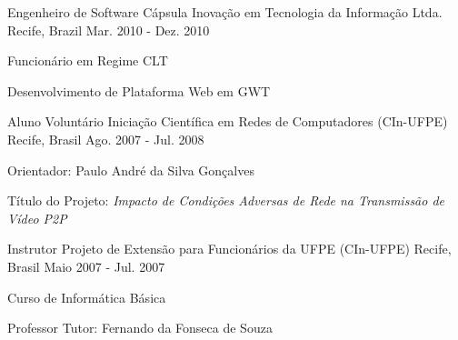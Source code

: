 \begin{cventries}
\cventry
	{Engenheiro de Software}
	{Cápsula Inovação em Tecnologia da Informação Ltda.}
	{Recife, Brazil}
	{Mar. 2010 - Dez. 2010}
	{\begin{cvitems}
		\item{Funcionário em Regime CLT}
		\item{Desenvolvimento de Plataforma Web em GWT}
	\end{cvitems}}



\cventry
	{Aluno Voluntário}
	{Iniciação Científica em Redes de Computadores (CIn-UFPE)}
	{Recife, Brasil}
	{Ago. 2007 - Jul. 2008}
	{\begin{cvitems}
		\item{Orientador: Paulo André da Silva Gonçalves}
		\item{Título do Projeto: \textit{Impacto de Condições Adversas de Rede na Transmissão de Vídeo P2P}}
	\end{cvitems}}

\cventry
	{Instrutor}
	{Projeto de Extensão para Funcionários da UFPE (CIn-UFPE)}
	{Recife, Brasil}
	{Maio 2007 - Jul. 2007}
	{\begin{cvitems}
		\item{Curso de Informática Básica}
		\item{Professor Tutor: Fernando da Fonseca de Souza}
	\end{cvitems}}


\end{cventries}
